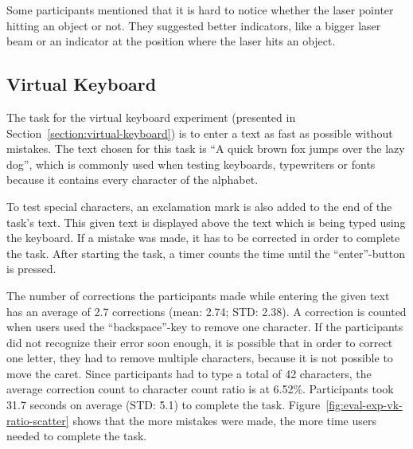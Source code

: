 Some participants mentioned that it is hard to notice whether the laser pointer hitting an object or not. They suggested better indicators, like a bigger laser beam or an indicator at the position where the laser hits an object.


\subsection{Virtual Keyboard}\label{section:eval-res-vk}

The task for the virtual keyboard experiment (presented in Section~\ref{section:virtual-keyboard}) is to enter a text as fast as possible without mistakes. The text chosen for this task is \enquote{A quick brown fox jumps over the lazy dog}, which is commonly used when testing keyboards, typewriters or fonts because it contains every character of the alphabet.

To test special characters, an exclamation mark is also added to the end of the task's text. This given text is displayed above the text which is being typed using the keyboard. If a mistake was made, it has to be corrected in order to complete the task. After starting the task, a timer counts the time until the \enquote{enter}-button is pressed.

The number of corrections the participants made while entering the given text has an average of 2.7 corrections (mean: 2.74; \gls{STD}: 2.38). A correction is counted when users used the \enquote{backspace}-key to remove one character. If the participants did not recognize their error soon enough, it is possible that in order to correct one letter, they had to remove multiple characters, because it is not possible to move the caret. Since participants had to type a total of 42 characters, the average correction count to character count ratio is at 6.52\%.
Participants took 31.7 seconds on average (\gls{STD}: 5.1) to complete the task. Figure~\ref{fig:eval-exp-vk-ratio-scatter} shows that the more mistakes were made, the more time users needed to complete the task.

